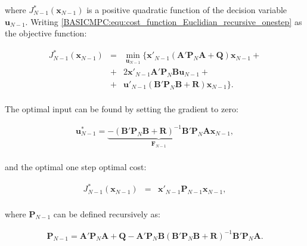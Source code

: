    where $J^*_{N-1}(\textbf{x}_{N-1})$ is a positive quadratic function of the decision variable $\textbf{u}_{N-1}$. Writing \ref{BASICMPC:equ:cost_function_Euclidian_recursive_onestep} as the objective function:

    \begin{equation}
        \begin{array}{rcl}
         J^*_{N-1}(\textbf{x}_{N-1})&=&\min_{\textbf{u}_{N-1}}\{\textbf{x}'_{N-1}(\textbf{A}'\textbf{P}_N\textbf{A}+\textbf{Q})\textbf{x}_{N-1}+\\
         &+&2\textbf{x}'_{N-1}\textbf{A}'\textbf{P}_N\textbf{B}\textbf{u}_{N-1}+\\
         &+&\textbf{u}'_{N-1}(\textbf{B}'\textbf{P}_N\textbf{B}+\textbf{R})\textbf{x}_{N-1}\}.\\
        \end{array}
        \label{BASICMPC:equ:cost_function_Euclidian_recursive_substituted}
    \end{equation}

    The optimal input can be found by setting the gradient to zero:

    \begin{equation}
        \begin{array}{rcl}
        \textbf{u}^*_{N-1}=\underbrace{-(\textbf{B}'\textbf{P}_N\textbf{B}+\textbf{R})^{-1}\textbf{B}'\textbf{P}_N\textbf{A}}_{\textbf{F}_{N-1}}\textbf{x}_{N-1},\\
        \end{array}
        \label{BASICMPC:equ:cost_function_Euclidian_recursive_optimum}
    \end{equation}

    and the optimal one step optimal cost:

    \begin{equation}
        \begin{array}{rcl}
        J^*_{N-1}(\textbf{x}_{N-1})&=&\textbf{x}'_{N-1}\textbf{P}_{N-1}\textbf{x}_{N-1},\\
        \end{array}
        \label{BASICMPC:equ:cost_function_Euclidian_recursive_stepback}
    \end{equation}

    where $\textbf{P}_{N-1}$ can be defined recursively as:

    \begin{equation}
        \begin{array}{rcl}
        \textbf{P}_{N-1}=\textbf{A}'\textbf{P}_N\textbf{A}+\textbf{Q}-\textbf{A}'\textbf{P}_N\textbf{B}(\textbf{B}'\textbf{P}_N\textbf{B}+\textbf{R})^{-1}\textbf{B}'\textbf{P}_N\textbf{A}.\\
        \end{array}
        \label{BASICMPC:equ:cost_function_Euclidian_recursive_P}
    \end{equation}

